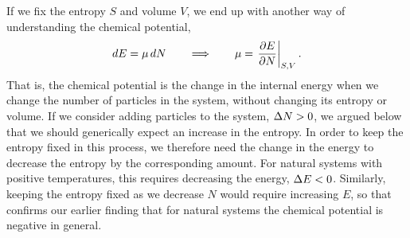 If we fix the entropy $S$ and volume $V$, we end up with another way of understanding the chemical potential,
\begin{equation}
  \label{eq:mu_E}
  dE = \mu \, dN \qquad \Longrightarrow \qquad \mu = \left.\frac{\partial E}{\partial N}\right|_{S, V}.
\end{equation}
That is, the chemical potential is the change in the internal energy when we change the number of particles in the system, without changing its entropy or volume.
If we consider adding particles to the system, $\Delta N > 0$, we argued below  that we should generically expect an increase in the entropy.
In order to keep the entropy fixed in this process, we therefore need the change in the energy to decrease the entropy by the corresponding amount.
For natural systems with positive temperatures, this requires decreasing the energy, $\Delta E < 0$.
Similarly, keeping the entropy fixed as we decrease $N$ would require increasing $E$, so that  confirms our earlier finding that for natural systems the chemical potential is negative in general.
